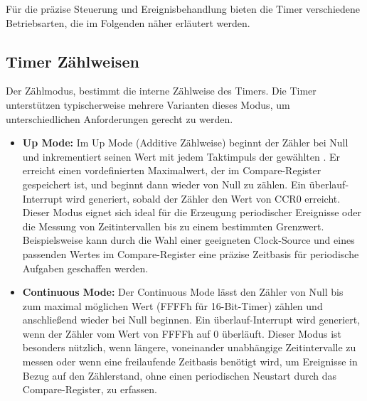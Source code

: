 F\"ur die pr\"azise Steuerung und Ereignisbehandlung bieten die Timer verschiedene Betriebsarten, die im Folgenden n\"aher erl\"autert werden.

\newpage
\subsection{Timer Z\"ahlweisen}
\label{Timer_CountMode}

Der Z\"ahlmodus, bestimmt die interne Z\"ahlweise des Timers. Die Timer unterst\"utzen typischerweise mehrere Varianten dieses Modus, um unterschiedlichen Anforderungen gerecht zu werden. 

\begin{itemize}
	\item \textbf{Up Mode:} Im Up Mode (Additive Z\"ahlweise) beginnt der Z\"ahler bei Null und inkrementiert seinen Wert mit jedem Taktimpuls der gew\"ahlten . Er erreicht einen vordefinierten Maximalwert, der im Compare-Register gespeichert ist, und beginnt dann wieder von Null zu z\"ahlen. Ein \"uberlauf-Interrupt wird generiert, sobald der Z\"ahler den Wert von CCR0 erreicht. Dieser Modus eignet sich ideal f\"ur die Erzeugung periodischer Ereignisse oder die Messung von Zeitintervallen bis zu einem bestimmten Grenzwert. Beispielsweise kann durch die Wahl einer geeigneten Clock-Source und eines passenden Wertes im Compare-Register eine pr\"azise Zeitbasis f\"ur periodische Aufgaben geschaffen werden. 
	
	\item \textbf{Continuous Mode:} Der Continuous Mode l\"asst den Z\"ahler von Null bis zum maximal m\"oglichen Wert (FFFFh f\"ur 16-Bit-Timer) z\"ahlen und anschlie{\ss}end wieder bei Null beginnen. Ein \"uberlauf-Interrupt wird generiert, wenn der Z\"ahler vom Wert von FFFFh auf 0 \"uberl\"auft.  Dieser Modus ist besonders n\"utzlich, wenn l\"angere, voneinander unabh\"angige Zeitintervalle zu messen oder wenn eine freilaufende Zeitbasis ben\"otigt wird, um Ereignisse in Bezug auf den Z\"ahlerstand, ohne einen periodischen Neustart durch das Compare-Register, zu erfassen. 


\end{itemize}
